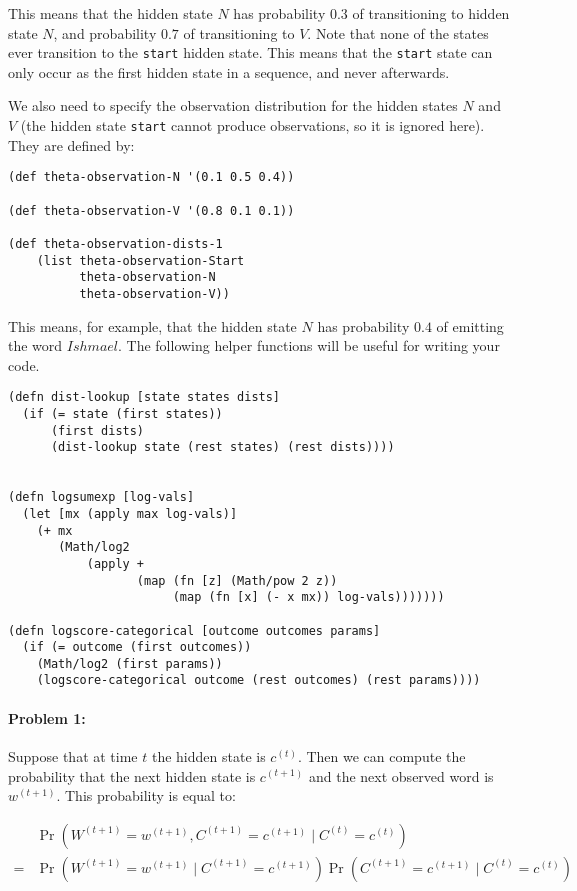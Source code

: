 \documentclass[10pt]{article}
\begin{document}
This means that the hidden state $N$ has probability $0.3$
of transitioning to hidden state $N$, and probability $0.7$ of
transitioning to $V$. Note that none of the states ever transition to
the \texttt{start} hidden state. This means that the \texttt{start}
state can only occur as the first hidden state in a sequence, and
never afterwards.

We also need to specify the observation distribution for the hidden
states $N$ and $V$ (the hidden state \texttt{start} cannot produce
observations, so it is ignored here). They are defined by:

\begin{lstlisting}
(def theta-observation-N '(0.1 0.5 0.4))

(def theta-observation-V '(0.8 0.1 0.1))

(def theta-observation-dists-1
    (list theta-observation-Start 
          theta-observation-N 
          theta-observation-V))
\end{lstlisting}


This means, for example, that the hidden state $N$ has probability
$0.4$ of emitting the word $Ishmael$. The following helper functions
will be useful for writing your code.

\begin{lstlisting}
(defn dist-lookup [state states dists]
  (if (= state (first states))
      (first dists)
      (dist-lookup state (rest states) (rest dists))))
  

(defn logsumexp [log-vals]
  (let [mx (apply max log-vals)]
    (+ mx
       (Math/log2
           (apply +
                  (map (fn [z] (Math/pow 2 z))
                       (map (fn [x] (- x mx)) log-vals)))))))

(defn logscore-categorical [outcome outcomes params]
  (if (= outcome (first outcomes))
    (Math/log2 (first params))
    (logscore-categorical outcome (rest outcomes) (rest params))))
\end{lstlisting}


\hrulefill
\paragraph{Problem 1:}

Suppose that at time $t$ the hidden state is $c^{(t)}$. Then we can
compute the probability that the next hidden state is $c^{(t+1)}$ and
the next observed word is $w^{(t+1)}$. This probability is equal to:

$$\begin{align*} 
&\Pr(W^{(t+1)} = w^{(t+1)}, C^{(t+1)} =c^{(t+1)} \mid C^{(t)} = c^{(t)}) \\ 
=   &\Pr(W^{(t+1)} = w^{(t+1)} \mid C^{(t+1)}=c^{(t+1)}) \Pr(C^{(t+1)} =c^{(t+1)} \mid C^{(t)} = c^{(t)})
  \end{align*}$$
\end{document}
